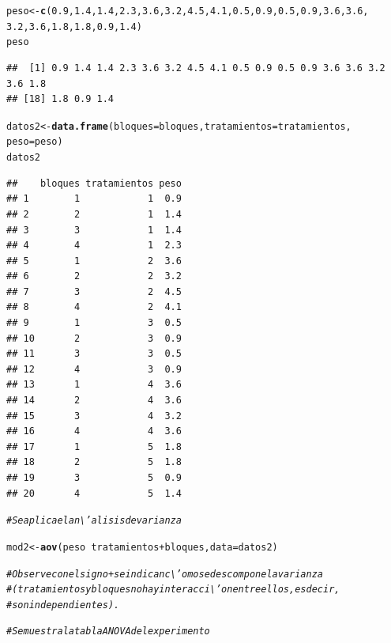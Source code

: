 \documentclass[12pt,letterpaper]{article}\usepackage[]{graphicx}\usepackage[]{color}
\makeatletter
\newcommand{\hlnum}[1]{\textcolor[rgb]{0.686,0.059,0.569}{#1}}%
\newcommand{\hlcom}[1]{\textcolor[rgb]{0.678,0.584,0.686}{\textit{#1}}}%
\newcommand{\hlopt}[1]{\textcolor[rgb]{0,0,0}{#1}}%
\newcommand{\hlstd}[1]{\textcolor[rgb]{0.345,0.345,0.345}{#1}}%
\newcommand{\hlkwb}[1]{\textcolor[rgb]{0.69,0.353,0.396}{#1}}%
\newcommand{\hlkwc}[1]{\textcolor[rgb]{0.333,0.667,0.333}{#1}}%
\newcommand{\hlkwd}[1]{\textcolor[rgb]{0.737,0.353,0.396}{\textbf{#1}}}%
\newenvironment{kframe}{%
 \def\at@end@of@kframe{}%
 \ifinner\ifhmode%
  \def\at@end@of@kframe{\end{minipage}}%
  \begin{minipage}{\columnwidth}%
 \fi\fi%
 \def\FrameCommand##1{\hskip\@totalleftmargin \hskip-\fboxsep
 \colorbox{shadecolor}{##1}\hskip-\fboxsep
     \hskip-\linewidth \hskip-\@totalleftmargin \hskip\columnwidth}%
 \MakeFramed {\advance\hsize-\width
   \@totalleftmargin\z@ \linewidth\hsize
   \@setminipage}}%
 {\par\unskip\endMakeFramed%
 \at@end@of@kframe}
\newenvironment{knitrout}{}{} %
\makeatother
\begin{document}
\begin{itemize}
\begin{knitrout}
\begin{kframe}
\begin{alltt}
\hlstd{peso} \hlkwb{<-} \hlkwd{c}\hlstd{(}\hlnum{0.9}\hlstd{,} \hlnum{1.4}\hlstd{,} \hlnum{1.4}\hlstd{,} \hlnum{2.3}\hlstd{,} \hlnum{3.6}\hlstd{,} \hlnum{3.2}\hlstd{,} \hlnum{4.5}\hlstd{,} \hlnum{4.1}\hlstd{,} \hlnum{0.5}\hlstd{,} \hlnum{0.9}\hlstd{,} \hlnum{0.5}\hlstd{,} \hlnum{0.9}\hlstd{,} \hlnum{3.6}\hlstd{,} \hlnum{3.6}\hlstd{,}
          \hlnum{3.2}\hlstd{,} \hlnum{3.6}\hlstd{,} \hlnum{1.8}\hlstd{,} \hlnum{1.8}\hlstd{,} \hlnum{0.9}\hlstd{,} \hlnum{1.4} \hlstd{)}
\hlstd{peso}
\end{alltt}
\begin{verbatim}
##  [1] 0.9 1.4 1.4 2.3 3.6 3.2 4.5 4.1 0.5 0.9 0.5 0.9 3.6 3.6 3.2 3.6 1.8
## [18] 1.8 0.9 1.4
\end{verbatim}
\begin{alltt}
\hlstd{datos2} \hlkwb{<-} \hlkwd{data.frame}\hlstd{(}\hlkwc{bloques} \hlstd{= bloques,} \hlkwc{tratamientos} \hlstd{= tratamientos,}
                     \hlkwc{peso} \hlstd{= peso)}
\hlstd{datos2}
\end{alltt}
\begin{verbatim}
##    bloques tratamientos peso
## 1        1            1  0.9
## 2        2            1  1.4
## 3        3            1  1.4
## 4        4            1  2.3
## 5        1            2  3.6
## 6        2            2  3.2
## 7        3            2  4.5
## 8        4            2  4.1
## 9        1            3  0.5
## 10       2            3  0.9
## 11       3            3  0.5
## 12       4            3  0.9
## 13       1            4  3.6
## 14       2            4  3.6
## 15       3            4  3.2
## 16       4            4  3.6
## 17       1            5  1.8
## 18       2            5  1.8
## 19       3            5  0.9
## 20       4            5  1.4
\end{verbatim}
\begin{alltt}
\hlcom{# Se aplica el an\textbackslash{}'alisis de varianza }

\hlstd{mod2} \hlkwb{<-} \hlkwd{aov}\hlstd{(peso} \hlopt{~} \hlstd{tratamientos} \hlopt{+} \hlstd{bloques,} \hlkwc{data} \hlstd{= datos2)}

\hlcom{# Observe con el signo + se indican c\textbackslash{}'omo se descompone la varianza }
\hlcom{# (tratamientos y bloques no hay interacci\textbackslash{}'on entre ellos, es decir, }
\hlcom{# son independientes).}

\hlcom{# Se muestra la tabla ANOVA del experimento }


\end{alltt}
\end{kframe}
\end{knitrout}
\end{itemize}
\end{document}
